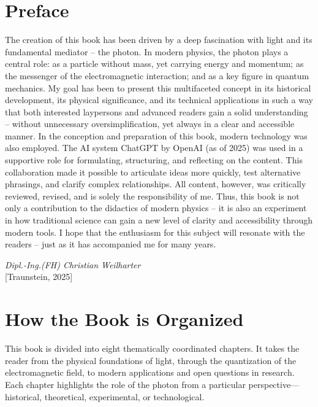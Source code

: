 \chapter*{Preface}



The creation of this book has been driven by a deep fascination with light and its fundamental mediator – the photon. In modern physics, the photon plays a central role: as a particle without mass, yet carrying energy and momentum; as the messenger of the electromagnetic interaction; and as a key figure in quantum mechanics.  
\noindent
My goal has been to present this multifaceted concept in its historical development, its physical significance, and its technical applications in such a way that both interested laypersons and advanced readers gain a solid understanding – without unnecessary oversimplification, yet always in a clear and accessible manner.  
\noindent
In the conception and preparation of this book, modern technology was also employed. The AI system ChatGPT by OpenAI (as of 2025) was used in a supportive role for formulating, structuring, and reflecting on the content. This collaboration made it possible to articulate ideas more quickly, test alternative phrasings, and clarify complex relationships.  
All content, however, was critically reviewed, revised, and is solely the responsibility of me.  
\noindent
Thus, this book is not only a contribution to the didactics of modern physics – it is also an experiment in how traditional science can gain a new level of clarity and accessibility through modern tools.  
\noindent
I hope that the enthusiasm for this subject will resonate with the readers – just as it has accompanied me for many years.  

\begin{flushright}
	\textit{Dipl.-Ing.(FH) Christian Weilharter} \\
	\vspace{0.5em}
	[Traunstein, 2025]
\end{flushright}
\chapter*{How the Book is Organized}

This book is divided into eight thematically coordinated chapters. It takes the reader from the physical foundations of light, through the quantization of the electromagnetic field, to modern applications and open questions in research. Each chapter highlights the role of the photon from a particular perspective—historical, theoretical, experimental, or technological.

